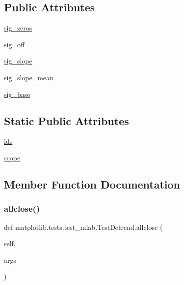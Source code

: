 \subsection*{Public Attributes}
\begin{DoxyCompactItemize}
\item 
\hyperlink{classmatplotlib_1_1tests_1_1test__mlab_1_1TestDetrend_aed924658ac0a65f1852d92fe0cd659f1}{sig\+\_\+zeros}
\item 
\hyperlink{classmatplotlib_1_1tests_1_1test__mlab_1_1TestDetrend_a6396d66ecc60ea37219c56941f60fe97}{sig\+\_\+off}
\item 
\hyperlink{classmatplotlib_1_1tests_1_1test__mlab_1_1TestDetrend_aeca356fe2034ddac9c3f3b8eba8b1668}{sig\+\_\+slope}
\item 
\hyperlink{classmatplotlib_1_1tests_1_1test__mlab_1_1TestDetrend_a6482aae61802c9573adf4f0621dcdee4}{sig\+\_\+slope\+\_\+mean}
\item 
\hyperlink{classmatplotlib_1_1tests_1_1test__mlab_1_1TestDetrend_a23bf63db2558ceb442e0a3e714c461f0}{sig\+\_\+base}
\end{DoxyCompactItemize}
\subsection*{Static Public Attributes}
\begin{DoxyCompactItemize}
\item 
\hyperlink{classmatplotlib_1_1tests_1_1test__mlab_1_1TestDetrend_ac15fb28d1610bf7ab94e05dde9d972c2}{ids}
\item 
\hyperlink{classmatplotlib_1_1tests_1_1test__mlab_1_1TestDetrend_ae421ae48a0f0533c698325d57893291f}{scope}
\end{DoxyCompactItemize}


\subsection{Member Function Documentation}
\mbox{\label{classmatplotlib_1_1tests_1_1test__mlab_1_1TestDetrend_a01e6e811f9be984d7820fbb298e2053b}} 
\subsubsection{\texorpdfstring{allclose()}{allclose()}}
{\footnotesize\ttfamily def matplotlib.\+tests.\+test\+\_\+mlab.\+Test\+Detrend.\+allclose (\begin{DoxyParamCaption}\item[{}]{self,  }\item[{}]{args }\end{DoxyParamCaption})}

